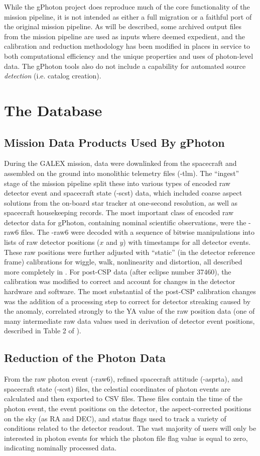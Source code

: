 \documentclass[preprint]{aastex}
\begin{document}
While the gPhoton project does reproduce much of the core functionality of the mission pipeline, it is not intended as either a full migration or a faithful port of the original mission pipeline. As will be described, some archived output files from the mission pipeline are used as inputs where deemed expedient, and the calibration and reduction methodology has been modified in places in service to both computational efficiency and the unique properties and uses of photon-level data. The gPhoton tools also do not include a capability for automated source \emph{detection} (i.e. catalog creation).

\section{The Database}
\label{database}
\subsection{Mission Data Products Used By gPhoton}
During the GALEX mission, data were downlinked from the spacecraft and assembled on the ground into monolithic telemetry files (-tlm). The ``ingest'' stage of the mission pipeline split these into various types of encoded raw detector event and spacecraft state (-scst) data, which included coarse aspect solutions from the on-board star tracker at one-second resolution, as well as spacecraft housekeeping records. The most important class of encoded raw detector data for gPhoton, containing nominal scientific observations, were the -raw6 files. The -raw6 were decoded with a sequence of bitwise manipulations into lists of raw detector positions ($x$ and $y$) with timestamps for all detector events. These raw positions were further adjusted with ``static'' (in the detector reference frame) calibrations for wiggle, walk, nonlinearity and distortion, all described more completely in \citet{mor2007}. For post-CSP data (after eclipse number 37460), the calibration was modified to correct and account for changes in the detector hardware and software. The most substantial of the post-CSP calibration changes was the addition of a processing step to correct for detector streaking caused by the anomaly, correlated strongly to the YA value of the raw position data (one of many intermediate raw data values used in derivation of detector event positions, described in Table 2 of \cite{mor2007}).

\subsection{Reduction of the Photon Data}
From the raw photon event (-raw6), refined spacecraft attitude (-asprta), and spacecraft state (-scst) files, the celestial coordinates of photon events are calculated and then exported to CSV files. These files contain the time of the photon event, the event positions on the detector, the aspect-corrected positions on the sky (as RA and DEC), and status flags used to track a variety of conditions related to the detector readout. The vast majority of users will only be interested in photon events for which the photon file flag value is equal to zero, indicating nominally processed data.
\end{document}
